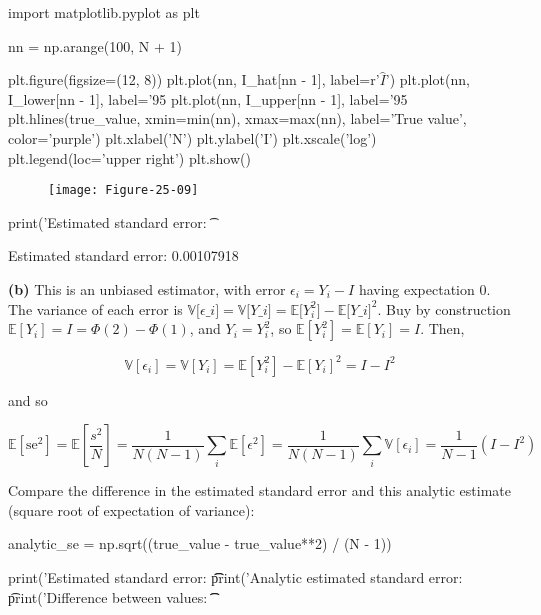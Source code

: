 \begin{python}
import matplotlib.pyplot as plt

nn = np.arange(100, N + 1)

plt.figure(figsize=(12, 8))
plt.plot(nn, I_hat[nn - 1], label=r'$\hat{I}$')
plt.plot(nn, I_lower[nn - 1], label='95%
plt.plot(nn, I_upper[nn - 1], label='95%
plt.hlines(true_value, xmin=min(nn), xmax=max(nn), label='True value', color='purple')
plt.xlabel('N')
plt.ylabel('I')
plt.xscale('log')
plt.legend(loc='upper right')
plt.show()
\end{python}

\begin{figure}[H]
\centering
\texttt{[image: Figure-25-09]}
\end{figure}

\begin{python}
print('Estimated standard error: \t %
\end{python}

\begin{console}
Estimated standard error:        0.00107918
\end{console}

\textbf{(b)} This is an unbiased estimator, with error
\(\epsilon_{i} = Y_{i} - I\) having expectation 0. The variance of each
error is $ \mathbb{V}{[}\epsilon\_{i}{]} = \mathbb{V}{[}Y\_{i}{]} =
\mathbb{E}{[}Y_{i}^{2}{]} - \mathbb{E}{[}Y\_{i}{]}^{2}$. Buy by
construction \(\mathbb{E}[Y_{i}] = I = \Phi(2) - \Phi(1)\), and
\(Y_{i} = Y_{i}^{2}\), so \(\mathbb{E}[Y_{i}^{2}] = \mathbb{E}[Y_{i}] = I\). Then,

\[ \mathbb{V}[\epsilon_{i}] = \mathbb{V}[Y_{i}] = \mathbb{E}[Y_{i}^{2}] - \mathbb{E}[Y_{i}]^{2} = I - I^{2} \]

and so

\[ \mathbb{E}[\text{se}^{2}] = \mathbb{E}\left[\frac{s^{2}}{N}\right] = \frac{1}{N(N - 1)} \sum_{i} \mathbb{E}[\epsilon^{2}] = \frac{1}{N(N - 1)} \sum_{i} \mathbb{V}[\epsilon_{i}] = \frac{1}{N - 1} (I - I^{2}) \]

Compare the difference in the estimated standard error and this
analytic estimate (square root of expectation of variance):

\begin{python}
analytic_se = np.sqrt((true_value - true_value**2) / (N - 1))

print('Estimated standard error: \t\t %
print('Analytic estimated standard error: \t %
print('Difference between values: \t\t %
\end{python}

